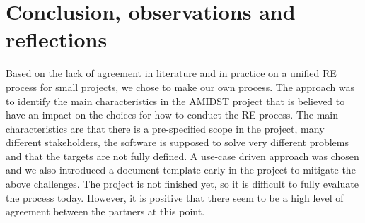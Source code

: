 \section{Conclusion, observations and reflections}
\label{sec:conclusion}

Based on the lack of agreement in literature and in practice on a unified RE process for small projects, we chose to make our own process.  The approach was to identify the main characteristics in the AMIDST project that is believed to have an impact on the choices for how to conduct the RE process.  The main characteristics are that there is a pre-specified scope in the project, many different stakeholders, the software is supposed to solve very different problems and that the targets are not fully defined.  A use-case driven approach was chosen and we also introduced a document template early in the project to mitigate the above challenges.  The project is not finished yet, so it is difficult to fully evaluate the process today.  However, it is positive that there seem to be a high level of agreement between the partners at this point.
